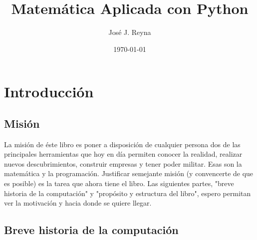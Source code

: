 \documentclass{article}
\title{Matemática Aplicada con Python}
\author{José J. Reyna}
\date{\today}
\begin{document}
\label{start}

\maketitle

\newpage

\section{Introducción}\label{introduccion}

\subsection{Misión}\label{mision}

La misión de éste libro es poner a disposición de cualquier persona dos de las principales
herramientas que hoy en día permiten conocer la realidad, realizar nuevos 
descubrimientos, construir empresas y tener poder militar. Esas son la matemática
y la programación. Justificar semejante misión (y convencerte de que es posible) 
es la tarea que ahora tiene el libro. Las siguientes partes, "breve historia de la
computación" y "propósito y estructura del libro", espero permitan ver la motivación y hacia donde
se quiere llegar.

\subsection{Breve historia de la computación}\label{historia}
\end{document}
